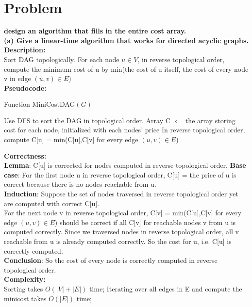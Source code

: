 \documentclass{article}
\begin{document}
\clearpage
\section{Problem \uppercase\expandafter{}}
\textbf{design an algorithm that fills in the entire cost array.\\
(a) Give a linear-time algorithm that works for directed acyclic graphs.\\}
\textbf{\large Description:\\}
Sort DAG topologically. For each node $u \in V$, in reverse topological order, compute the minimum cost of u by min(the cost of u itself, the cost of every node v in edge $(u,v) \in E$)\\
\textbf{\large Pseudocode:\\}
\begin{algorithm}[H]
  \caption{Function MiniCostDAG$(G)$}
  \label{alg1}
  \begin{algorithmic}
  \STATE Use DFS to sort the DAG in topological order.
  \STATE Array C $\Longleftarrow$ the array storing cost for each node, initialized with each nodes' price
  \STATE In reverse topological order, compute C[u] = min(C[u],C[v] for every edge $(u,v)\in E$)
  \end{algorithmic}
\end{algorithm}
\noindent\textbf{\large Correctness:\\}
\textbf{Lemma}: C[u] is corrected for nodes computed in reverse topological order.
\textbf{Base case}: For the first node u in reverse topological order, C[u] = the price of u is correct because there is no nodes reachable from u.\\
\textbf{Induction}: Suppose the set of nodes traversed in reverse topological order yet are computed with correct C[u].\\
For the next node v in reverse topological order, C[v] = min(C[u],C[v] for every edge $(u,v)\in E$) should be correct if all C[v] for reachable nodes v from u is computed correctly. Since we traversed nodes in reverse topological order, all v reachable from u is already computed correctly. So the cost for u, i.e. C[u] is correctly computed.\\
\textbf{Conclusion}:
So the cost of every node is correctly computed in reverse topological order.\\
\textbf{\large Complexity:\\}
Sorting takes $O(|V|+|E|)$ time; Iterating over all edges in E and compute the minicost takes $O(|E|)$ time;\\
\end{document}
